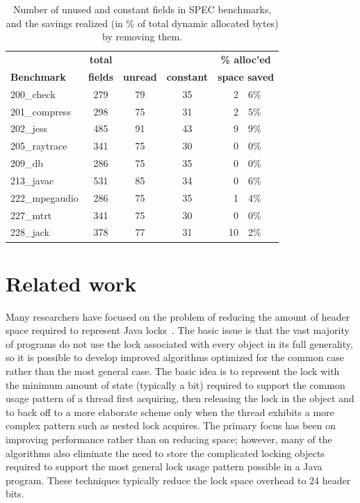 \documentclass{acmconf}
\begin{document}
\begin{table}
\begin{tabular}{lcccr@{.}l}
&\bf total&&&\multicolumn{2}{c}{\bf\% alloc'ed}\\
\bf Benchmark &\bf fields &\bf unread &\bf constant &
\multicolumn{2}{c}{\bf space saved} \\\hline
200\_check      & 279 &   79   &   35   &  2&6\% \\
201\_compress   & 298 &   75   &   31   &  2&5\% \\
202\_jess       & 485 &   91   &   43   &  9&9\% \\
205\_raytrace   & 341 &   75   &   30   &  0&0\% \\
209\_db         & 286 &   75   &   35   &  0&0\% \\
213\_javac      & 531 &   85   &   34   &  0&6\% \\
222\_mpegaudio  & 286 &   75   &   35   &  1&4\% \\
227\_mtrt       & 341 &   75   &   30   &  0&0\% \\
228\_jack       & 378 &   77   &   31   & 10&2\% \\
\end{tabular}
\caption{Number of unused and constant fields in SPEC benchmarks,
  and the savings realized (in \% of total dynamic allocated bytes) by
  removing them.}
\label{tab:const-unused}
\end{table}


\section{Related work}

Many researchers have focused on the problem of reducing the amount of
header space required to represent Java
locks~\cite{BKMS98,OK99,ADGKRW99}. The basic issue is that the vast
majority of programs do not use the lock associated with every object
in its full generality, so it is possible to develop improved
algorithms optimized for the common case rather than the most general
case. The basic idea is to represent the lock with the minimum amount
of state (typically a bit) required to support the common usage
pattern of a thread first acquiring, then releasing the lock in the
object and to back off to a more elaborate scheme only when the thread
exhibits a more complex pattern such as nested lock acquires. The
primary focus has been on improving performance rather than on
reducing space; however, many of the algorithms also eliminate the
need to store the complicated locking objects required to support the
most general lock usage pattern possible in a Java program. These
techniques typically reduce the lock space overhead to 24 header bits.
\end{document}

